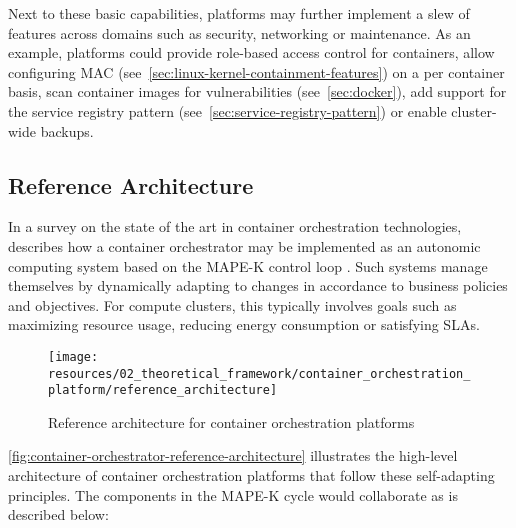 Next to these basic capabilities, platforms may further implement a slew of features across domains such as security, networking or maintenance. As an example, platforms could provide role-based access control for containers, allow configuring \acl{MAC} (see~\autoref{sec:linux-kernel-containment-features}) on a per container basis, scan container images for vulnerabilities (see~\autoref{sec:docker}), add support for the service registry pattern (see~\autoref{sec:service-registry-pattern}) or enable cluster-wide backups.


\subsection{Reference Architecture}
\label{sec:orchestration-reference-architecture}

In a survey on the state of the art in container orchestration technologies, \citeauthor{casalicchio2019container} describes how a container orchestrator may be implemented as an autonomic computing system based on the \acs{MAPE-K} control loop \cite[pp.~226-228]{casalicchio2019container}. Such systems manage themselves by dynamically adapting to changes in accordance to business policies and objectives. For compute clusters, this typically involves goals such as maximizing resource usage, reducing energy consumption or satisfying \acsp{SLA}.

\begin{figure}[hbt]
  \centering
  \texttt{[image: resources/02\_theoretical\_framework/container\_orchestration\_platform/reference\_architecture]}
  \caption[Reference architecture for container orchestration platforms]{Reference architecture for container orchestration platforms \cite[p.~226]{casalicchio2019container}}
  \label{fig:container-orchestrator-reference-architecture}
\end{figure}

\FloatBarrier

\autoref{fig:container-orchestrator-reference-architecture} illustrates the high-level architecture of container orchestration platforms that follow these self-adapting principles. The components in the \acs{MAPE-K} cycle would collaborate as is described below:

